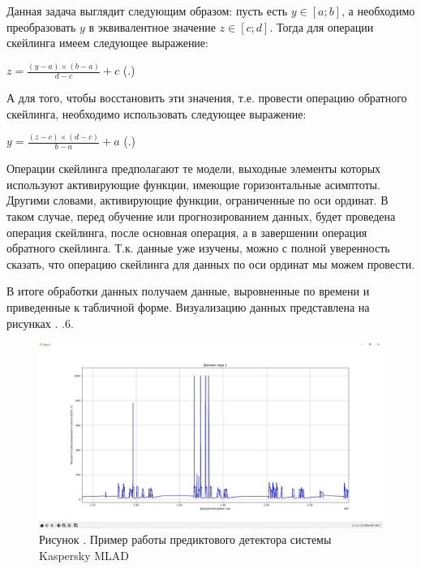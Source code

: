   \par \redline Данная задача выглядит следующим образом: пусть есть $y \in \left[a; b\right]$, а необходимо преобразовать $y$ в эквивалентное значение $z \in \left[c; d\right]$. Тогда для операции скейлинга имеем следующее выражение:

  	\formulaspace \par \redline 
  $ z = \frac{\left(y - a\right) \times \left(b - a\right)}{d - c} + c $
  \hfill (\thechaptercntr .\theformulacntr) \redline
  \formulaspace \addtocounter{formulacntr}{1}
  

  \par \redline А для того, чтобы восстановить эти значения, т.е. провести операцию обратного скейлинга, необходимо использовать следующее выражение: 

	\formulaspace \par \redline 
$ y = \frac{\left(z - c\right) \times \left(d - c\right)}{b - a} + a $
\hfill (\thechaptercntr .\theformulacntr) \redline
\formulaspace \addtocounter{formulacntr}{1}

  \par \redline Операции скейлинга предполагают те модели, выходные элементы которых используют активирующие функции, имеющие горизонтальные асимптоты. Другими словами, активирующие функции, ограниченные по оси ординат. В таком случае, перед обучение или прогнозированием данных, будет проведена операция скейлинга, после основная операция, а в завершении операция обратного скейлинга. Т.к. данные уже изучены, можно с полной уверенность сказать, что операцию скейлинга для данных по оси ординат мы можем провести.
  
  \par \redline В итоге обработки данных получаем данные, выровненные по времени и приведенные к табличной форме. Визуализацию данных представлена на рисунках \thechaptercntr.\theimagecntr {--} \thechaptercntr.6.

  \par
  
    \begin{figure}
  	\centering
  	\def\svgwidth{\textwidth}
  	\includegraphics[scale=0.6]{images/data_1_visual_2.jpg}
  	\caption*{\gostFont Рисунок \thechaptercntr .\theimagecntr \spc {--} Пример работы предиктового детектора системы Kaspersky MLAD}
  	\label{fig:MLADBlackBox}
  \end{figure} \addtocounter{imagecntr}{1}
  
